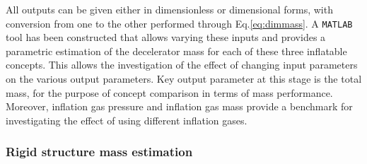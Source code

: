 All outputs can be given either in dimensionless or dimensional forms, with conversion from one to the other performed through Eq.\ref{eq:dimmass}. A \texttt{MATLAB} tool has been constructed that allows varying these inputs and provides a parametric estimation of the decelerator mass for each of these three inflatable concepts. This allows the investigation of the effect of changing input parameters on the various output parameters. Key output parameter at this stage is the total mass, for the purpose of concept comparison in terms of mass performance. Moreover, inflation gas pressure and inflation gas mass provide a benchmark for investigating the effect of using different inflation gases.




\subsubsection{Rigid structure mass estimation}
